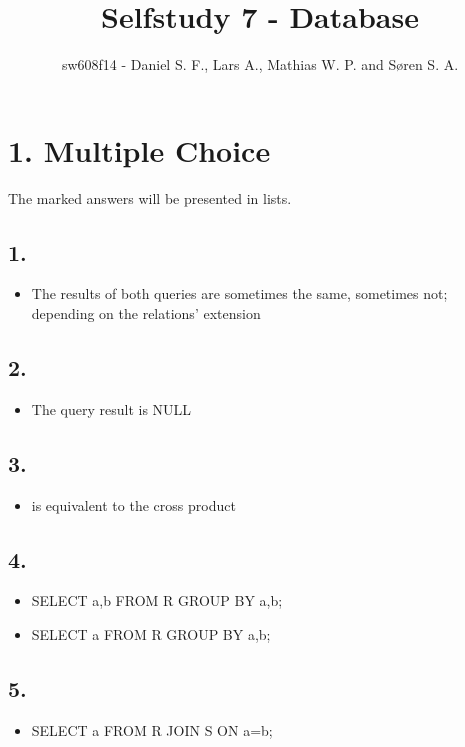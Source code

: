 \documentclass[10pt,a4paper,final]{report}
\title{Selfstudy 7 - Database}
\author{sw608f14 - Daniel S. F., Lars A., Mathias W. P. and Søren S. A.}
\begin{document}
\maketitle

\section*{1. Multiple Choice}
The marked answers will be presented in lists.
\subsection*{1.}
\begin{itemize}
     \item The results of both queries are sometimes the same, sometimes not; depending on the
relations’ extension
\end{itemize}

\subsection*{2.}
\begin{itemize}
     \item The query result is NULL
\end{itemize}

\subsection*{3.}
\begin{itemize}
     \item is equivalent to the cross product
\end{itemize}

\subsection*{4.}
\begin{itemize}
     \item SELECT a,b FROM R GROUP BY a,b;
     \item SELECT a FROM R GROUP BY a,b;
\end{itemize}


\subsection*{5.}
\begin{itemize}
     \item SELECT a FROM R JOIN S ON a=b;
\end{itemize}
\end{document}
